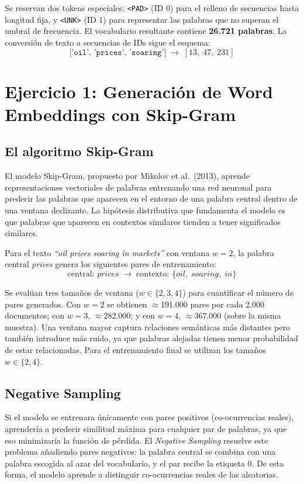 \documentclass{article}
\begin{document}
Se reservan dos tokens especiales: \texttt{<PAD>} (ID 0) para el relleno de secuencias
hasta longitud fija, y \texttt{<UNK>} (ID 1) para representar las palabras que no superan
el umbral de frecuencia. El vocabulario resultante contiene \textbf{26.721 palabras}. La
conversión de texto a secuencias de IDs sigue el esquema:
\[
  \texttt{['oil', 'prices', 'soaring']} \;\longrightarrow\; [13,\; 47,\; 231]
\]

\section{Ejercicio 1: Generación de Word Embeddings con Skip-Gram}

\subsection{El algoritmo Skip-Gram}

El modelo Skip-Gram, propuesto por Mikolov et al.\ (2013), aprende representaciones vectoriales
de palabras entrenando una red neuronal para predecir las palabras que aparecen en el entorno
de una palabra central dentro de una ventana deslizante. La hipótesis distributiva que
fundamenta el modelo es que palabras que aparecen en contextos similares tienden a tener
significados similares.

Para el texto \textit{``oil prices soaring in markets''} con ventana $w = 2$, la palabra
central \textit{prices} genera los siguientes pares de entrenamiento:
\[
  \text{central: } \textit{prices} \;\longrightarrow\;
  \text{contexto: } \{\textit{oil},\; \textit{soaring},\; \textit{in}\}
\]

Se evalúan tres tamaños de ventana ($w \in \{2, 3, 4\}$) para cuantificar el número de
pares generados. Con $w = 2$ se obtienen $\approx$191.000 pares por cada 2.000 documentos;
con $w = 3$, $\approx$282.000; y con $w = 4$, $\approx$367.000 (sobre la misma muestra).
Una ventana mayor captura relaciones semánticas más distantes pero también introduce más
ruido, ya que palabras alejadas tienen menor probabilidad de estar relacionadas. Para el
entrenamiento final se utilizan los tamaños $w \in \{2, 4\}$.

\subsection{Negative Sampling}

Si el modelo se entrenara únicamente con pares positivos (co-ocurrencias reales), aprendería
a predecir similitud máxima para cualquier par de palabras, ya que eso minimizaría la función
de pérdida. El \textit{Negative Sampling} resuelve este problema añadiendo pares negativos:
la palabra central se combina con una palabra escogida al azar del vocabulario, y el par
recibe la etiqueta 0. De esta forma, el modelo aprende a distinguir co-ocurrencias reales de
las aleatorias.
\end{document}
